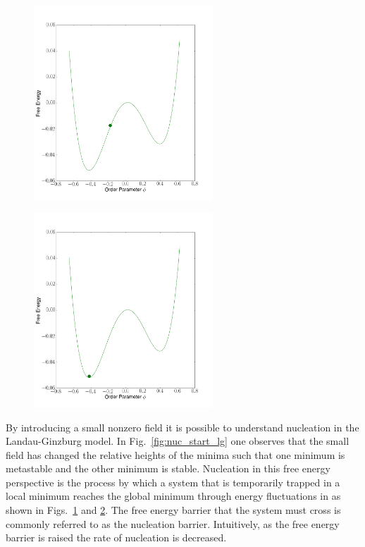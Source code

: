 \begin{figure}[!h]
	\centering
	\includegraphics[width=0.6\textwidth]{Images/classicalNucleationHilltop2.png}
	\label{fig:nuc_mid_lg}
\end{figure}%
\begin{figure}[!h]
	\centering
	\includegraphics[width=0.6\textwidth]{Images/classicalNucleationEnd.png}
	\label{fig:nuc_end_lg}
\end{figure}%
By introducing a small nonzero field it is possible to understand nucleation in the Landau-Ginzburg model. In Fig.~\ref{fig:nuc_start_lg} one observes that the small field has changed the relative heights of the minima such that one minimum is metastable and the other minimum is stable. Nucleation in this free energy perspective is the process by which a system that is temporarily trapped in a local minimum reaches the global minimum through energy fluctuations in as shown in Figs.~\ref{fig:nuc_mid_lg} and \ref{fig:nuc_end_lg}. The free energy barrier that the system  must cross is commonly referred to as the nucleation barrier. Intuitively, as the free energy barrier is raised the rate of nucleation is decreased. 


